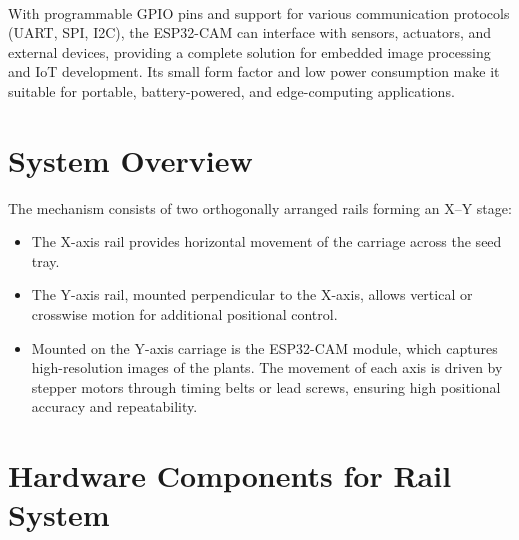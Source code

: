 \documentclass[../main]{subfiles}
\begin{document}
\paragraph{}
With programmable GPIO pins and support for various communication protocols (UART, SPI, I2C), the ESP32-CAM can interface with sensors, actuators, and external devices, providing a complete solution for embedded image processing and IoT development. Its small form factor and low power consumption make it suitable for portable, battery-powered, and edge-computing applications.


\section{System Overview}
The mechanism consists of two orthogonally arranged rails forming an X–Y stage:
\begin{itemize}
    \item The X-axis rail provides horizontal movement of the carriage across the seed tray.
    \item The Y-axis rail, mounted perpendicular to the X-axis, allows vertical or crosswise motion for additional positional control.
    \item Mounted on the Y-axis carriage is the ESP32-CAM module, which captures high-resolution images of the plants.
The movement of each axis is driven by stepper motors through timing belts or lead screws, ensuring high positional accuracy and repeatability.

\end{itemize}
\section{Hardware Components for Rail System}
\end{document}
